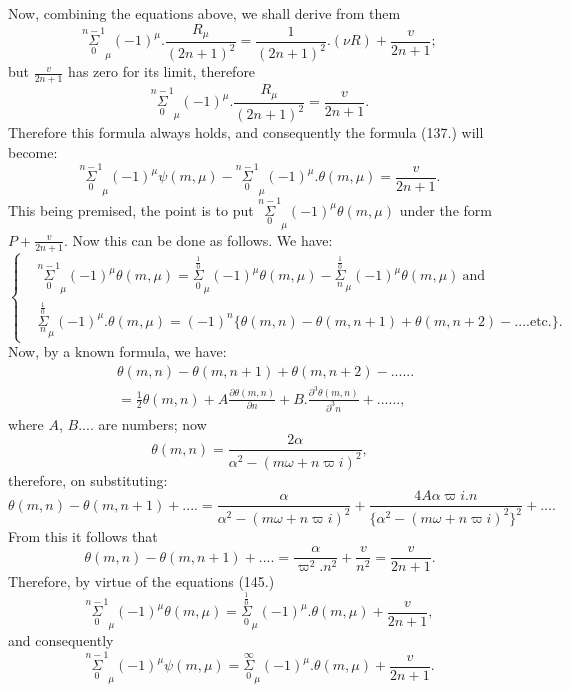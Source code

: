 \documentclass{article}
\begin{document}
Now, combining the equations above, we shall derive from them
\[ \overset{n-1}{\underset{0}{\Sigma}}_{\mu}(-1)^{\mu}.\frac{R_{\mu}}{(2n+1)^{2}}=\frac{1}{(2n+1)^{2}}.(\nu R)+\frac{v}{2n+1}; \]
but $\frac{v}{2n+1}$ has zero for its limit, therefore
\[ \overset{n-1}{\underset{0}{\Sigma}}_{\mu}(-1)^{\mu}.\frac{R_{\mu}}{(2n+1)^{2}}=\frac{v}{2n+1}. \]
Therefore this formula always holds, and consequently the formula (137.) will become:
\[ \overset{n-1}{\underset{0}{\Sigma}}_{\mu}(-1)^{\mu}\psi(m,\mu)-\overset{n-1}{\underset{0}{\Sigma}}_{\mu}(-1)^{\mu}.\theta(m,\mu)=\frac{v}{2n+1}. \tag{144.} \]
This being premised, the point is to put $\overset{n-1}{\underset{0}{\Sigma}}_{\mu}(-1)^{\mu}\theta(m,\mu)$ under the form $P+\frac{v}{2n+1}$.
Now this can be done as follows. We have:
\[ \left\{\begin{aligned}
&\overset{n-1}{\underset{0}{\Sigma}}_{\mu}(-1)^{\mu}\theta(m,\mu)=\overset{\frac{1}{0}}{\underset{0}{\Sigma}}_{\mu}(-1)^{\mu}\theta(m,\mu)-\overset{\frac{1}{0}}{\underset{n}{\Sigma}}_{\mu}(-1)^{\mu}\theta(m,\mu)\ \text{and}\\
&\overset{\frac{1}{0}}{\underset{n}{\Sigma}}_{\mu}(-1)^{\mu}.\theta(m,\mu)=(-1)^{n}\{\theta(m,n)-\theta(m,n+1)+\theta(m,n+2)-....\text{etc.}\}.
\end{aligned}\right. \tag{145.} \]
Now, by a known formula, we have:
\[ \begin{aligned}
&\theta(m,n)-\theta(m,n+1)+\theta(m,n+2)-......\\
&=\tfrac{1}{2}\theta(m,n)+A\frac{\partial\theta(m,n)}{\partial n}+B.\frac{\partial^{3}\theta(m,n)}{\partial^{3}n}+......,
\end{aligned} \]
where $A$, $B$$....$ are numbers; now
\[ \theta(m,n)=\frac{2\alpha}{\alpha^{2}-(m\omega+n\varpi i)^{2}}, \]
therefore, on substituting:
\[ \theta(m,n)-\theta(m,n+1)+....=\frac{\alpha}{\alpha^{2}-(m\omega+n\varpi i)^{2}}+\frac{4A\alpha\varpi i.n}{\{\alpha^{2}-(m\omega+n\varpi i)^{2}\}^{2}}+.... \]
From this it follows that
\[ \theta(m,n)-\theta(m,n+1)+....=\frac{\alpha}{\varpi^{2}.n^{2}}+\frac{v}{n^{2}}=\frac{v}{2n+1}. \]
Therefore, by virtue of the equations (145.)
\[ \overset{n-1}{\underset{0}{\Sigma}}_{\mu}(-1)^{\mu}\theta(m,\mu)=\overset{\frac{1}{0}}{\underset{0}{\Sigma}}_{\mu}(-1)^{\mu}.\theta(m,\mu)+\frac{v}{2n+1}, \]
and consequently
\[ \overset{n-1}{\underset{0}{\Sigma}}_{\mu}(-1)^{\mu}\psi(m,\mu)=\overset{\infty}{\underset{0}{\Sigma}}_{\mu}(-1)^{\mu}.\theta(m,\mu)+\frac{v}{2n+1}. \tag{146.} \]
\end{document}
